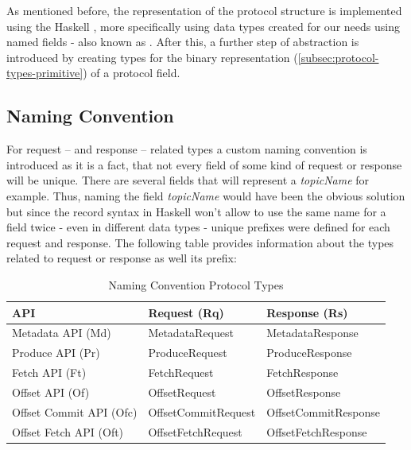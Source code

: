 As mentioned before, the representation of the protocol structure is implemented
using the Haskell , more
specifically using data types created for our needs using named fields - also
known as . After this, a
further step of abstraction is introduced by creating types for the binary
representation (\ref{subsec:protocol-types-primitive}) of a protocol field.

\subsection{Naming Convention}

For request -- and response -- related types a custom naming convention is introduced
as it is a fact, that not every field of some kind of request or response will
be unique. There are several fields that will represent a
\textit{topicName} for example. Thus, naming the field \textit{topicName} would
have been the obvious solution but since the record syntax in Haskell won't
allow to use the same name for a field twice - even in different data types -
unique prefixes were defined for each request and response. The following table
provides information about the types related to request or response as well its
prefix:

\begin{table}[H]
\centering
\begin{tabular}{|l|l|l|}
\hline
\textbf{API}            & \textbf{Request (Rq)} & \textbf{Response (Rs)} \\ \hline
Metadata API (Md)       & MetadataRequest       & MetadataResponse       \\ \hline
Produce API (Pr)        & ProduceRequest        & ProduceResponse        \\ \hline
Fetch API (Ft)          & FetchRequest          & FetchResponse          \\ \hline
Offset API (Of)         & OffsetRequest         & OffsetResponse         \\ \hline
Offset Commit API (Ofc) & OffsetCommitRequest   & OffsetCommitResponse   \\ \hline
Offset Fetch API (Oft)  & OffsetFetchRequest    & OffsetFetchResponse    \\ \hline
\end{tabular}
\caption{Naming Convention Protocol Types}
\end{table}

